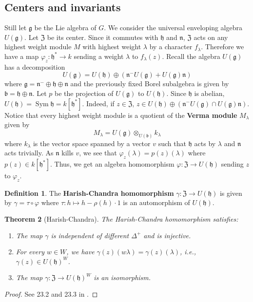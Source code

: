 \documentclass[11pt, a4paper]{article}
\newtheorem{theorem}{Theorem}[subsection]
\theoremstyle{definition}
\newtheorem{definition}[theorem]{Definition}
\newcommand{\D}[0]{\Delta}
\newcommand{\Sym}[0]{\operatorname{Sym}}
\newcommand{\h}{\mathfrak h}
\renewcommand{\b}{\mathfrak b}
\newcommand{\g}{\mathfrak g}
\begin{document}
    \subsection{Centers and invariants}
    Still let $\g$ be the Lie algebra of $G$. We consider the universal enveloping algebra $U(\g)$. Let $\mathfrak Z$ be its center. Since it commutes with $\h$ and $\mathfrak n$, $\mathfrak Z$ acts on any highest weight module $M$ with highest weight $\lambda$ by a character $f_\lambda$. Therefore we have a map $\varphi_z:\h^*\to k$ sending a weight $\lambda$ to $f_\lambda(z)$. Recall the algebra $U(\g)$ has a decomposition
    \[U(\g)=U(\h)\oplus(\mathfrak n^-U(\g)+U(\g)\mathfrak n)\]
    where $\g=\mathfrak n^-\oplus\h\oplus\mathfrak n$ and the previously fixed Borel subalgebra is given by $\b=\h\oplus\mathfrak n$. Let $p$ be the projection of $U(\g)$ to $U(\h)$. Since $\h$ is abelian, $U(\h)=\Sym\h=k[\h^*]$. Indeed, if $z\in\mathfrak Z$, $z\in U(\h)\oplus(\mathfrak n^-U(\g)\cap U(\g)\mathfrak n)$. Notice that every highest weight module is a quotient of the \textbf{Verma module} $M_\lambda$ given by
    \[M_\lambda=U(\g)\otimes_{U(\b)}k_\lambda\]
    where $k_\lambda$ is the vector space spanned by a vector $v$ such that $\h$ acts by $\lambda$ and $\mathfrak n$ acts trivially. As $\mathfrak n$ kills $v$, we see that $\varphi_z(\lambda)=p(z)(\lambda)$ where $p(z)\in k[\h^*]$. Thus, we get an algebra homomorphism $\varphi:\mathfrak Z\to U(\h)$ sending $z$ to $\varphi_z$.
    \begin{definition}
        The \textbf{Harish-Chandra homomorphism} $\gamma:\mathfrak Z\to U(\h)$ is given by $\gamma=\tau\circ\varphi$ where $\tau:h\mapsto h-\rho(h)\cdot 1$ is an automorphism of $U(\h)$.
    \end{definition}
    \begin{theorem}[Harish-Chandra]
        The Harish-Chandra homomorphism satisfies:
        \begin{enumerate}[\normalfont(i)]
            \item The map $\gamma$ is independent of different $\D^+$ and is injective.
            \item For every $w\in W$, we have $\gamma(z)(w\lambda)=\gamma(z)(\lambda)$, i.e., $\gamma(z)\in U(\h)^W$.
            \item The map $\gamma:\mathfrak Z\to U(\h)^W$ is an isomorphism.
        \end{enumerate}
    \end{theorem}
    \begin{proof}
        See 23.2 and 23.3 in \cite{humphreys-lie}.
    \end{proof}
\end{document}
